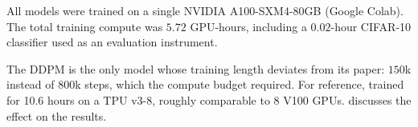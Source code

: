 All models were trained on a single NVIDIA A100-SXM4-80GB (Google Colab). The total training compute was
$5.72$ GPU-hours, including a $0.02$-hour CIFAR-10 classifier used as an evaluation instrument.

The DDPM is the only model whose training length deviates from its paper: $150$k instead of $800$k steps, which
the compute budget required. For reference, \citet{ho2020ddpm} trained for 10.6 hours on a TPU v3-8, roughly
comparable to 8 V100 GPUs.  discusses the effect on the results.
